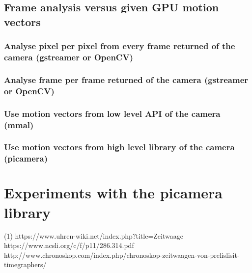 \documentclass[11pt]{report}
\begin{document}
\section{Frame analysis versus given GPU motion vectors}

\subsection{Analyse pixel per pixel from every frame returned of the camera (gstreamer or OpenCV)}

\subsection{Analyse frame per frame returned of the camera (gstreamer or OpenCV)}
\subsection{Use motion vectors from low level API of the camera (mmal)}
\subsection{Use motion vectors from high level library of the camera (picamera)}

\chapter {Experiments with the picamera library}

\printglossaries

\begin{thebibliography}{9}
(1) https://www.uhren-wiki.net/index.php?title=Zeitwaage
 https://www.ncsli.org/c/f/p11/286.314.pdf
 http://www.chronoskop.com/index.php/chronoskop-zeitwaagen-von-prelislisit-timegraphers/
\end{thebibliography}
\end{document}
